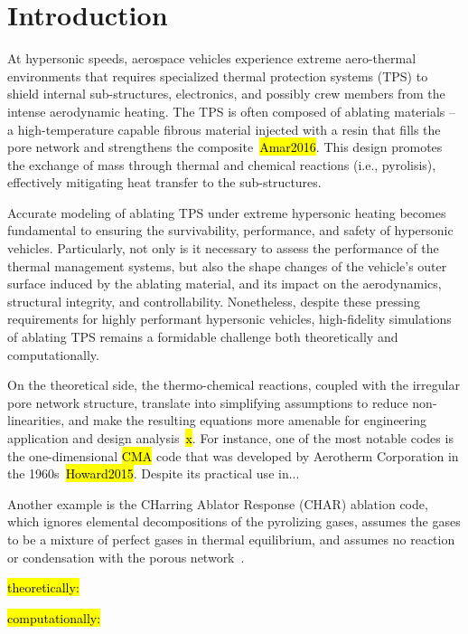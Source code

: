 \section{Introduction}

At hypersonic speeds, aerospace vehicles experience extreme aero-thermal environments that requires specialized thermal protection systems (TPS) to shield internal sub-structures, electronics, and possibly crew members from the intense aerodynamic heating. The TPS is often composed of ablating materials -- a high-temperature capable fibrous material injected with a resin that fills the pore network and strengthens the composite~\hl{Amar2016}. This design promotes the exchange of mass through thermal and chemical reactions (i.e., pyrolisis), effectively mitigating heat transfer to the sub-structures.

Accurate modeling of ablating TPS under extreme hypersonic heating becomes fundamental to ensuring the survivability, performance, and safety of hypersonic vehicles. Particularly, not only is it necessary to assess the performance of the thermal management systems, but also the shape changes of the vehicle's outer surface induced by the ablating material, and its impact on the aerodynamics, structural integrity, and controllability. Nonetheless, despite these pressing requirements for highly performant hypersonic vehicles, high-fidelity simulations of ablating TPS remains a formidable challenge both theoretically and computationally.

On the theoretical side, the thermo-chemical reactions, coupled with the irregular pore network structure, translate into simplifying assumptions to reduce non-linearities, and make the resulting equations more amenable for engineering application and design analysis~\hl{x}. For instance, one of the most notable codes is the one-dimensional \hl{CMA} code that was developed by Aerotherm Corporation in the 1960s~\hl{Howard2015}. Despite its practical use in...

Another example is the CHarring Ablator Response (CHAR) ablation code, which ignores elemental decompositions of the pyrolizing gases, assumes the gases to be a mixture of perfect gases in thermal equilibrium, and assumes no reaction or condensation with the porous network~\cite{Amar2016}.



\hl{theoretically:}

\hl{computationally:}
